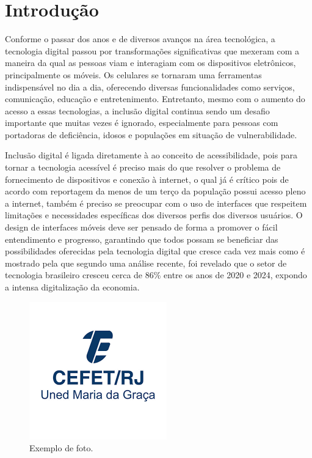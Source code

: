 \chapter{Introdução}

Conforme o passar dos anos e de diversos avanços na área tecnológica, a tecnologia digital passou por transformações significativas que mexeram com a maneira da qual as pessoas viam e interagiam com os dispositivos eletrônicos, principalmente os móveis. Os celulares se tornaram uma ferramentas indispensável no dia a dia, oferecendo diversas funcionalidades como serviços, comunicação, educação e entretenimento. Entretanto, mesmo com o aumento do acesso a essas tecnologias, a inclusão digital continua sendo um desafio importante que muitas vezes é ignorado, especialmente para pessoas com portadoras de deficiência, idosos e populações em situação de vulnerabilidade.

Inclusão digital é ligada diretamente à ao conceito de acessibilidade, pois para tornar a tecnologia acessível é preciso mais do que resolver o problema de fornecimento de dispositivos e conexão à internet, o qual já é crítico pois de acordo com reportagem da \cite{g1_acesso_pleno_internet_2022} menos de um terço da população possui acesso pleno a internet, também é preciso se preocupar com o uso de interfaces que respeitem limitações e necessidades específicas dos diversos perfis dos diversos usuários. O design de interfaces móveis deve ser pensado de forma a promover o fácil entendimento e progresso, garantindo que todos possam se beneficiar das possibilidades oferecidas pela tecnologia digital que cresce cada vez mais como é mostrado pela \cite{veja_pais_se_digitaliza_2024} que segundo uma análise recente, foi revelado que o setor de tecnologia brasileiro cresceu cerca de 86\% entre os anos de 2020 e 2024, expondo a intensa digitalização da economia.


\label{sec:introducao}

\begin{figure}[H]
\centering
\includegraphics[width=0.5\linewidth]{imagens/cefet.png}
\caption{Exemplo de foto.}
\label{fig:cefet}
\end{figure}

